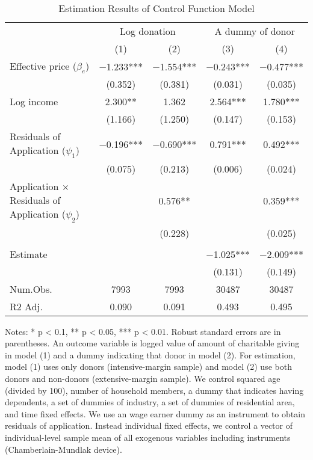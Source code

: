 \begin{table}

\caption{Estimation Results of Control Function Model\label{tab:cf}}
\centering
\fontsize{8}{10}\selectfont
\begin{threeparttable}
\begin{tabular}[t]{lcccc}
\toprule
\multicolumn{1}{c}{ } & \multicolumn{2}{c}{Log donation} & \multicolumn{2}{c}{A dummy of donor} \\
\cmidrule(l{3pt}r{3pt}){2-3} \cmidrule(l{3pt}r{3pt}){4-5}
  & (1) & (2) & (3) & (4)\\
\midrule
Effective price ($\beta_e$) & \num{-1.233}*** & \num{-1.554}*** & \num{-0.243}*** & \num{-0.477}***\\
 & (\num{0.352}) & (\num{0.381}) & (\num{0.031}) & (\num{0.035})\\
Log income & \num{2.300}** & \num{1.362} & \num{2.564}*** & \num{1.780}***\\
 & (\num{1.166}) & (\num{1.250}) & (\num{0.147}) & (\num{0.153})\\
Residuals of Application ($\psi_1$) & \num{-0.196}*** & \num{-0.690}*** & \num{0.791}*** & \num{0.492}***\\
 & (\num{0.075}) & (\num{0.213}) & (\num{0.006}) & (\num{0.024})\\
Application $\times$ Residuals of Application ($\psi_2$) &  & \num{0.576}** &  & \num{0.359}***\\
 &  & (\num{0.228}) &  & (\num{0.025})\\
\midrule
\addlinespace[0.3em]
\multicolumn{5}{l}{\textit{Implied price elasticity}}\\
\hspace{1em}Estimate &  &  & \num{-1.025}*** & \num{-2.009}***\\
\hspace{1em} &  &  & (\num{0.131}) & (\num{0.149})\\
Num.Obs. & \num{7993} & \num{7993} & \num{30487} & \num{30487}\\
R2 Adj. & \num{0.090} & \num{0.091} & \num{0.493} & \num{0.495}\\
\bottomrule
\end{tabular}
\begin{tablenotes}
\item Notes: * p < 0.1, ** p < 0.05, *** p < 0.01. Robust standard errors are in parentheses. An outcome variable is logged value of amount of charitable giving in model (1) and a dummy indicating that donor in model (2). For estimation, model (1) uses only donors (intensive-margin sample) and model (2) use both donors and non-donors (extensive-margin sample). We control squared age (divided by 100), number of household members, a dummy that indicates having dependents, a set of dummies of industry, a set of dummies of residential area, and time fixed effects. We use an wage earner dummy as an instrument to obtain residuals of application. Instead individual fixed effects, we control a vector of individual-level sample mean of all exogenous variables including instruments (Chamberlain-Mundlak device).
\end{tablenotes}
\end{threeparttable}
\end{table}
